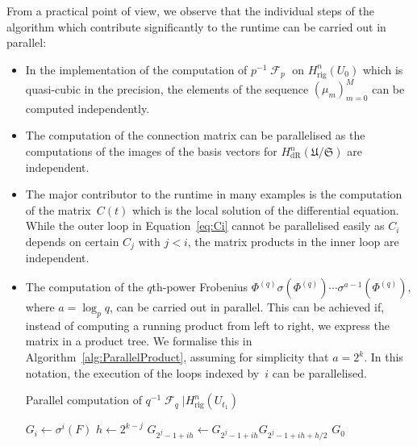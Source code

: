 \documentclass[a4paper,11pt]{article}
\numberwithin{equation}{section}
\DeclareMathOperator{\Frob}{\mathcal{F}} %
\providecommand{\HdR}{H_{\text{dR}}}    %
\providecommand{\Hrig}{H_{\text{rig}}}  %
\theoremstyle{definition}
\begin{document}
From a practical point of view, we observe that the individual steps 
of the algorithm which contribute significantly to the runtime can be 
carried out in parallel:
\begin{itemize}
\item In the implementation of the computation of $p^{-1} \Frob_p$ 
      on $\Hrig^{n}(U_0)$ which is quasi-cubic in the precision, 
      the elements of the sequence $(\mu_m)_{m=0}^{M}$ can be computed 
      independently.
\item The computation of the connection matrix can be parallelised 
      as the computations of the images of the basis vectors for 
      $\HdR^{n}(\mathfrak{U}/\mathfrak{S})$ are independent.
\item The major contributor to the runtime in many examples is the 
      computation of the matrix~$C(t)$ which is the local solution 
      of the differential equation.  While the outer loop in 
      Equation~\eqref{eq:Ci} cannot be parallelised easily 
      as $C_{i}$ depends on certain $C_{j}$ with $j < i$, the 
      matrix products in the inner loop are independent.
\item The computation of the $q$th-power Frobenius 
      $\Phi^{(q)} \sigma(\Phi^{(q)}) \dotsm \sigma^{a-1}(\Phi^{(q)})$, 
      where $a = \log_{p} q$, can be carried out in parallel.  This can 
      be achieved if, instead of computing a running product from left to 
      right, we express the matrix in a product tree.  We formalise this in 
      Algorithm~\ref{alg:ParallelProduct}, assuming for simplicity 
      that $a = 2^k$.  In this notation, the execution of the 
      loops indexed by~$i$ can be parallelised.
      \begin{algorithm}
      \caption{Parallel computation of $q^{-1} \Frob_{q} | \Hrig^{n}(U_{t_1})$}
      \label{alg:ParallelProduct}
      \begin{algorithmic}
      \vspace{1mm}
          \State $G_i \gets \sigma^{i}(F)$
      \EndFor
          \State $h \gets 2^{k-j}$
          \State $G_{2^j-1 + ih} \gets G_{2^j-1 + i h} G_{2^j-1 + ih + h/2}$
          \EndFor
      \EndFor
      \Return $G_0$
      \end{algorithmic}
      \end{algorithm}
\end{itemize}




\end{document}
